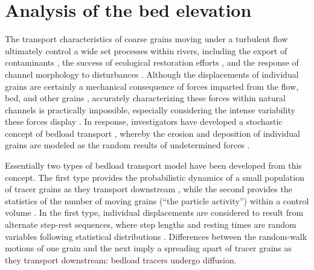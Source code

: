 
\chapter{Analysis of the bed elevation}
\label{ch:downDiff}

The transport characteristics of coarse grains moving under a turbulent flow ultimately control a wide set processes within rivers, including the export of contaminants \citep{Malmon2005,Macklin2006}, the success of ecological restoration efforts \citep{Gaeuman2017}, and the response of channel morphology to disturbances \citep{Hassan2017}.
Although the displacements of individual grains are certainly a mechanical consequence of forces imparted from the flow, bed, and other grains \citep{Wiberg1985, Vowinckel2014,Gonzalez2017}, accurately characterizing these forces within natural channels is practically impossible, especially considering the intense variability these forces display \citep{Schmeeckle2007,Celik2010, Dwivedi2011}. In response, investigators have developed a stochastic concept of bedload transport \citep{Einstein1937}, whereby the erosion and deposition of individual grains are modeled as the random results of undetermined forces \citep{Einstein1950,Paintal1971,Ancey2006}.

Essentially two types of bedload transport model have been developed from this concept. 
The first type provides the probabilistic dynamics of a small population of tracer grains as they transport downstream \citep{Einstein1937,Hubbell1964, Nakagawa1976,Martin2012,Lajeunesse2017,Wu2019}, while the second provides the statistics of the number of moving grains (``the particle activity'') within a control volume \citep{Einstein1950,Ancey2006,Ancey2008,Furbish2012a}.
In the first type, individual displacements are considered to result from alternate step-rest sequences, where step lengths and resting times are random variables following statistical distributions \citep{Einstein1937}. 
Differences between the random-walk motions of one grain and the next imply a spreading apart of tracer grains as they transport downstream: bedload tracers undergo diffusion.

